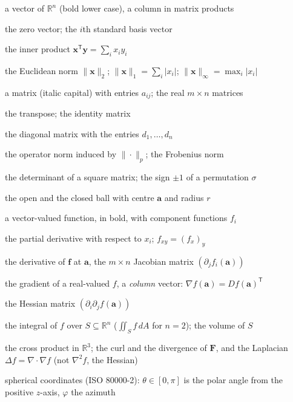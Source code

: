 \documentclass{sdbook-eng}
\begin{document}
\begin{symbols}
\item[$\mathbf x=(x_1,\ldots,x_n)$] a vector of $\mathbb R^n$ (bold lower case), a column in matrix products
\item[$\mathbf 0$, $\mathbf e_i$] the zero vector; the $i$th standard basis vector
\item[$\langle\mathbf x,\mathbf y\rangle$] the inner product $\mathbf x^{\mathsf T}\mathbf y=\sum_ix_iy_i$
\item[$\|\mathbf x\|$, $\|\mathbf x\|_p$] the Euclidean norm $\|\mathbf x\|_2$; $\|\mathbf x\|_1=\sum_i|x_i|$; $\|\mathbf x\|_\infty=\max_i|x_i|$
\item[$A=(a_{ij})$, $\mathbb R^{m\times n}$] a matrix (italic capital) with entries $a_{ij}$; the real $m\times n$ matrices
\item[$A^{\mathsf T}$, $I_n$] the transpose; the identity matrix
\item[$\operatorname{diag}(d_i)$] the diagonal matrix with the entries $d_1,\ldots,d_n$
\item[$\|A\|_p$, $\|A\|_{\mathrm F}$] the operator norm induced by $\|\cdot\|_p$; the Frobenius norm
\item[$\det A$, $\operatorname{sgn}\sigma$] the determinant of a square matrix; the sign $\pm1$ of a permutation $\sigma$
\item[$B(\mathbf a,r)$, $\bar B(\mathbf a,r)$] the open and the closed ball with centre $\mathbf a$ and radius $r$
\item[$\mathbf f=(f_1,\ldots,f_m)$] a vector-valued function, in bold, with component functions $f_i$
\item[$\partial_if$, $\partial f/\partial x_i$, $f_{x_i}$] the partial derivative with respect to $x_i$; $f_{xy}=(f_x)_y$
\item[$D\mathbf f(\mathbf a)$] the derivative of $\mathbf f$ at $\mathbf a$, the $m\times n$ Jacobian matrix $(\partial_jf_i(\mathbf a))$
\item[$\nabla f(\mathbf a)$] the gradient of a real-valued $f$, a \emph{column} vector: $\nabla f(\mathbf a)=Df(\mathbf a)^{\mathsf T}$
\item[$\nabla^2f(\mathbf a)$] the Hessian matrix $(\partial_i\partial_jf(\mathbf a))$
\item[$\int_Sf(\mathbf x)\,d\mathbf x$, $\operatorname{vol}(S)$] the integral of $f$ over $S\subseteq\mathbb R^n$ ($\iint_Sf\,dA$ for $n=2$); the volume of $S$
\item[$\mathbf x\times\mathbf y$, $\nabla\times\mathbf F$, $\nabla\cdot\mathbf F$] the cross product in $\mathbb R^3$; the curl and the divergence of $\mathbf F$, and the Laplacian $\Delta f=\nabla\cdot\nabla f$ (not $\nabla^2f$, the Hessian)
\item[$(r,\theta,\varphi)$] spherical coordinates (ISO 80000-2): $\theta\in[0,\pi]$ is the polar angle from the positive $z$-axis, $\varphi$ the azimuth
\end{symbols}
\end{document}
